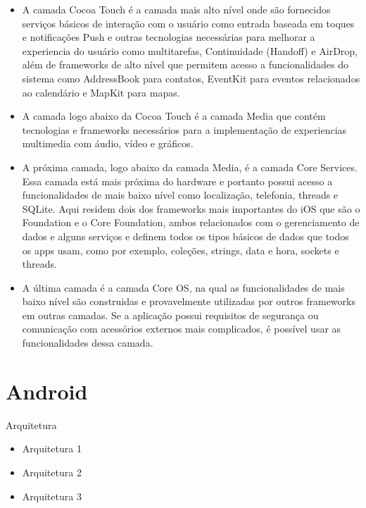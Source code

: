 \begin{itemize}

	\item A camada Cocoa Touch é a camada mais alto nível onde são fornecidos serviços básicos de interação 
    com o usuário como entrada baseada em toques e notificações Push e outras tecnologias necessárias para
     melhorar a experiencia do usuário como multitarefas, Continuidade (Handoff) e AirDrop, além de frameworks 
     de alto nível que permitem acesso a funcionalidades do sistema como AddressBook para contatos, EventKit 
     para eventos relacionados ao calendário e MapKit para mapas.
	\item A camada logo abaixo da Cocoa Touch é a camada Media que contém tecnologias e frameworks necessários 
    para a implementação de experiencias multimedia com áudio, vídeo e gráficos.
	\item A próxima camada, logo abaixo da camada Media, é a camada Core Services. Essa camada está mais próxima 
    do hardware e portanto possui acesso a funcionalidades de mais baixo nível como localização, telefonia, threads 
    e SQLite. Aqui residem dois dos frameworks mais importantes do iOS que são o Foundation e o Core Foundation, 
    ambos relacionados com o gerenciamento de dados e alguns serviços e definem todos os tipos básicos de dados que 
    todos os apps usam, como por exemplo, coleções, strings, data e hora, sockets e threads.
	\item A última camada é a camada Core OS, na qual as funcionalidades de mais baixo nível são construidas e 
    provavelmente utilizadas por outros frameworks em outras camadas. Se a aplicação possui requisitos de segurança 
    ou comunicação com acessórios externos mais complicados, é possível usar as funcionalidades dessa camada.

\end{itemize}

\section{Android}

Arquitetura

\begin{itemize}

	\item Arquitetura 1
    \item Arquitetura 2
    \item Arquitetura 3 

\end{itemize}

